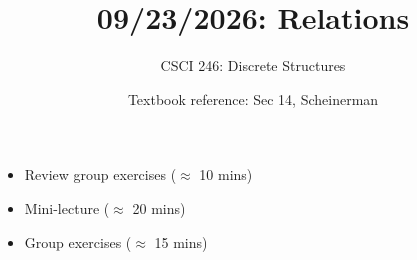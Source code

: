 \documentclass[10pt]{beamer}
\begin{document}





\title{09/23/2026: Relations}
\author{CSCI 246: Discrete Structures}
\date{Textbook reference: Sec 14, Scheinerman}

\begin{frame}
    \titlepage 
\end{frame}


\begin{frame}
\footnotesize 

%
%


\begin{myyellowbox}[title=Today's Agenda]
\begin{itemize}
	\item Review group exercises ($\approx$ 10 mins)
	\item Mini-lecture ($\approx$ 20 mins)
	\item Group exercises ($\approx$ 15 mins)
\end{itemize}


%	
\end{myyellowbox}
\vfill 

\end{frame}
\end{document}
